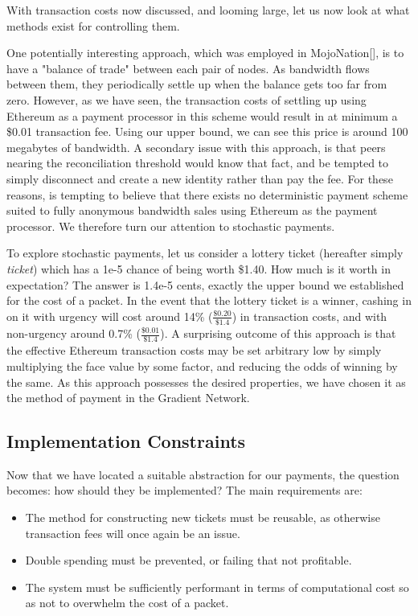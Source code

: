 \documentclass{article}
\begin{document}
With transaction costs now discussed, and looming large, let us now look at what methods exist for controlling them.

One potentially interesting approach, which was employed in MojoNation[], is to have a "balance of trade" between each pair of nodes. As bandwidth flows between them, they periodically settle up when the balance gets too far from zero. However, as we have seen, the transaction costs of settling up using Ethereum as a payment processor in this scheme would result in at minimum a \$0.01 transaction fee. Using our upper bound, we can see this price is around 100 megabytes of bandwidth. A secondary issue with this approach, is that peers nearing the reconciliation threshold would know that fact, and be tempted to simply disconnect and create a new identity rather than pay the fee. For these reasons, is tempting to believe that there exists no deterministic payment scheme suited to fully anonymous bandwidth sales using Ethereum as the payment processor. We therefore turn our attention to stochastic payments.

To explore stochastic payments, let us consider a lottery ticket (hereafter simply \emph{ticket}) which has a 1e-5 chance of being worth \$1.40. How much is it worth in expectation? The answer is 1.4e-5 cents, exactly the upper bound we established for the cost of a packet. In the event that the lottery ticket is a winner, cashing in on it with urgency will cost around 14\% ($\frac{\$0.20}{\$1.4}$) in transaction costs, and with non-urgency around 0.7\% ($\frac{\$0.01}{\$1.4}$). A surprising outcome of this approach is that the effective Ethereum transaction costs may be set arbitrary low by simply multiplying the face value by some factor, and reducing the odds of winning by the same. As this approach possesses the desired properties, we have chosen it as the method of payment in the Gradient Network.

\subsection{Implementation Constraints}

Now that we have located a suitable abstraction for our payments, the question becomes: how should they be implemented? The main requirements are:

\begin{itemize}
    \item The method for constructing new tickets must be reusable, as otherwise transaction fees will once again be an issue.
    \item Double spending must be prevented, or failing that not profitable.
    \item The system must be sufficiently performant in terms of computational cost so as not to overwhelm the cost of a packet.
\end{itemize}
\end{document}
